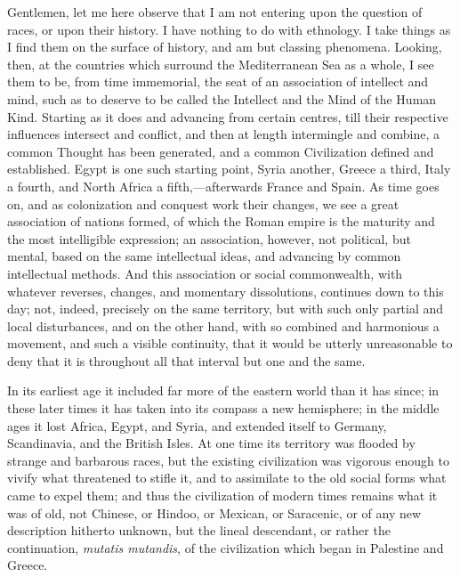 Gentlemen, let me here observe that I am not entering upon the
question of races, or upon their history. I have nothing to do with
ethnology. I take things as I find them on the surface of history, and
am but classing phenomena. Looking, then, at the countries which
surround the Mediterranean Sea as a whole, I see them to be, from time
immemorial, the seat of an association of intellect and mind, such as
to deserve to be called the Intellect and the Mind of the Human Kind.
Starting as it does and advancing from certain centres, till their
respective influences intersect and conflict, and then at length
intermingle and combine, a common Thought has been generated, and a
common Civilization defined and established. Egypt is one such
starting point, Syria another, Greece a third, Italy a fourth, and
North Africa a fifth,—afterwards France and Spain. As time goes on,
and as colonization and conquest work their changes, we see a
great association of nations formed, of which the Roman empire is the
maturity and the most intelligible expression; an association,
however, not political, but mental, based on the same intellectual
ideas, and advancing by common intellectual methods. And this
association or social commonwealth, with whatever reverses, changes,
and momentary dissolutions, continues down to this day; not, indeed,
precisely on the same territory, but with such only partial and local
disturbances, and on the other hand, with so combined and harmonious a
movement, and such a visible continuity, that it would be utterly
unreasonable to deny that it is throughout all that interval but one
and the same.

In its earliest age it included far more of the eastern world than
it has since; in these later times it has taken into its compass a new
hemisphere; in the middle ages it lost Africa, Egypt, and Syria, and
extended itself to Germany, Scandinavia, and the British Isles. At one
time its territory was flooded by strange and barbarous races, but the
existing civilization was vigorous enough to vivify what threatened to
stifle it, and to assimilate to the old social forms what came to
expel them; and thus the civilization of modern times remains what it
was of old, not Chinese, or Hindoo, or Mexican, or Saracenic, or of
any new description hitherto unknown, but the lineal descendant, or
rather the continuation, \emph{mutatis mutandis}, of the civilization
which began in Palestine and Greece.

